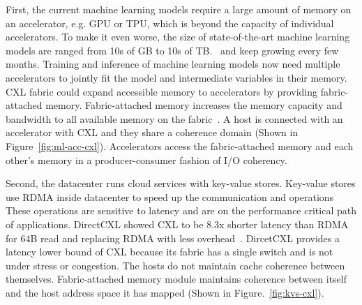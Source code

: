 %
%

First, the current machine learning models require a large amount of memory on an accelerator, e.g. GPU or TPU, which is beyond the capacity of individual accelerators.
%
To make it even worse, the size of state-of-the-art machine learning models are ranged from 10s of GB to 10s of TB.~\cite{zero:arxiv:2020, zero-infinity:sc:2021, zionex:isca:2022} and keep growing every few months.
%
Training and inference of machine learning models now need multiple accelerators to jointly fit the model and intermediate variables in their memory. 
%
CXL fabric could expand accessible memory to accelerators by providing fabric-attached memory.
%
Fabric-attached memory increases the memory capacity and bandwidth to all available memory on the fabric~\cite{cxl-3-0-spec, samsung-memory-expander:hcs:2022, memory-scalability:microchip}.
%
%
A host is connected with an accelerator with CXL and they share a coherence domain (Shown in Figure~\ref{fig:ml-acc-cxl}).   
%
Accelerators access the fabric-attached memory and each other's memory in a producer-consumer fashion of I/O coherency.
%

Second, the datacenter runs cloud services with key-value stores.
%
Key-value stores use RDMA inside datacenter to speed up the communication and operations~\cite{farm:nsdi:2014,herd:sigcomm:2014,eRPC:nsdi:2019, xstore:osdi:2020}
%
These operations are sensitive to latency and are on the performance critical path of applications. 
%
DirectCXL showed CXL to be 8.3x shorter latency than RDMA for 64B read and replacing RDMA with less overhead~\cite{directcxl:atc:2022}. 
%
DircetCXL provides a latency lower bound of CXL because its fabric has a single switch and is not under stress or congestion.
%
The hosts do not maintain cache coherence between themselves. Fabric-attached memory module maintains coherence between itself and the host address space it has mapped (Shown in Figure.~\ref{fig:kvs-cxl}).

